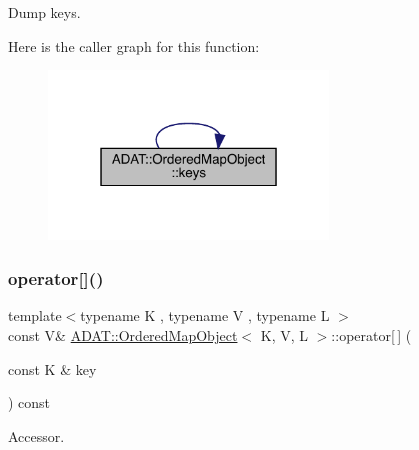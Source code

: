 Dump keys. 

Here is the caller graph for this function\+:\nopagebreak
\begin{figure}[H]
\begin{center}
\leavevmode
\includegraphics[width=211pt]{db/d8c/classADAT_1_1OrderedMapObject_ad376a69c5761afe8fe44d3a24c44ba4c_icgraph}
\end{center}
\end{figure}
\mbox{\label{classADAT_1_1OrderedMapObject_ad6bf82315b8676a1e7a5733ad6d48e85}} 
\subsubsection{\texorpdfstring{operator[]()}{operator[]()}\hspace{0.1cm}{\footnotesize\ttfamily [1/2]}}
{\footnotesize\ttfamily template$<$typename K , typename V , typename L $>$ \\
const V\& \mbox{\hyperlink{classADAT_1_1OrderedMapObject}{A\+D\+A\+T\+::\+Ordered\+Map\+Object}}$<$ K, V, L $>$\+::operator\mbox{[}$\,$\mbox{]} (\begin{DoxyParamCaption}\item[{const K \&}]{key }\end{DoxyParamCaption}) const\hspace{0.3cm}{\ttfamily [inline]}}



Accessor. 

